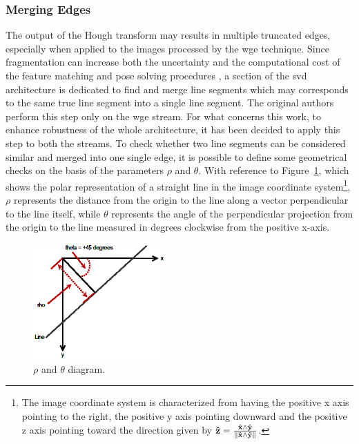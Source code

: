 \subsubsection{Merging Edges}\label{sec:mergingedges}
The output of the Hough transform may results in multiple truncated edges, especially when applied to the images processed by the \acrshort{wge} technique. Since fragmentation can increase both the uncertainty and the computational cost of the feature matching and pose solving procedures \cite{fracchio2019}, a section of the \acrshort{svd} architecture is dedicated to find and merge line segments which may corresponds to the same true line segment into a single line segment. The original authors \cite{Sharma2018} perform this step only on the \acrshort{wge} stream. For what concerns this work, to enhance robustness of the whole architecture, it has been decided to apply this step to both the streams.
To check whether two line segments can be considered similar and merged into one single edge, it is possible to define some geometrical checks on the basis of the parameters $\rho$ and $\theta$.
With reference to Figure~\ref{fig:rhotheta}, which shows the polar representation of a straight line in the image coordinate system\footnote{The image coordinate system is characterized from having the positive x axis pointing to the right, the positive y axis pointing downward and the positive z axis pointing toward the direction given by $  \mathbf{\hat{z}} = \frac{\mathbf{\hat{x}} \wedge \mathbf{\hat{y}}}{\left\lVert\mathbf{\hat{x}} \wedge \mathbf{\hat{y}}\right\rVert}$.}, $\rho$ represents the distance from the origin to the line along a vector perpendicular to the line itself, while $\theta$ represents the angle of the perpendicular projection from the origin to the line measured in degrees clockwise from the positive x-axis.

\begin{figure}[htbp]
  \centering
  \includegraphics[width=0.45\textwidth]{gfx/hough_rho_theta_diagram.eps}
  \caption{$\rho$ and $\theta$ diagram.}
  \label{fig:rhotheta}
\end{figure}

